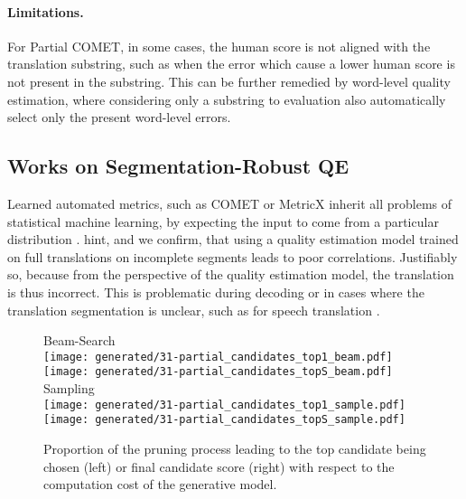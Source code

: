 \paragraph{Limitations.}
For Partial COMET, in some cases, the human score is not aligned with the translation substring, such as when the error which cause a lower human score is not present in the substring.
This can be further remedied by word-level quality estimation, where considering only a substring to evaluation also automatically select only the present word-level errors.


\subsection{Works on Segmentation-Robust QE}
Learned automated metrics, such as COMET or MetricX \citep{juraska-etal-2024-metricx} inherit all problems of statistical machine learning, by expecting the input to come from a particular distribution \citep{zouhar-etal-2024-pitfalls}.
\citet{amrhein-haddow-2022-dont} hint, and we confirm, that using a quality estimation model trained on full translations on incomplete segments leads to poor correlations.
Justifiably so, because from the perspective of the quality estimation model, the translation is thus incorrect.
This is problematic during decoding or in cases where the translation segmentation is unclear, such as for speech translation \citep{akhbardeh-etal-2021-findings-FIXED,salesky-etal-2023-evaluating,han-etal-2024-speechqe,sperber-etal-2024-evaluating}.




\begin{figure*}[ht]
    \centering
    Beam-Search\\
    \texttt{[image: generated/31-partial\_candidates\_top1\_beam.pdf]}
    \texttt{[image: generated/31-partial\_candidates\_topS\_beam.pdf]}
    Sampling\\
    \texttt{[image: generated/31-partial\_candidates\_top1\_sample.pdf]}
    \texttt{[image: generated/31-partial\_candidates\_topS\_sample.pdf]}

    \caption{
    Proportion of the pruning process leading to the top candidate being chosen (left) or final candidate score (right) with respect to the computation cost of the generative model.
    }
    \label{fig:31-partial_candidates_top1_beam}
\end{figure*}


